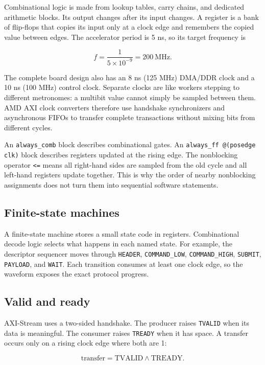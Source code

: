\documentclass[10pt]{article}
\begin{document}
Combinational logic is made from lookup tables, carry chains, and dedicated
arithmetic blocks. Its output changes after its input changes. A register is a
bank of flip-flops that copies its input only at a clock edge and remembers the
copied value between edges. The accelerator period is 5 ns, so its target
frequency is

\[
  f = \frac{1}{5\times10^{-9}} = 200\ \text{MHz}.
\]

The complete board design also has an 8 ns (125 MHz) DMA/DDR clock and a 10 ns
(100 MHz) control clock. Separate clocks are like workers stepping to different
metronomes: a multibit value cannot simply be sampled between them. AMD AXI
clock converters therefore use handshake synchronizers and asynchronous FIFOs
to transfer complete transactions without mixing bits from different cycles.

An \texttt{always\_comb} block describes combinational gates. An
\texttt{always\_ff @(posedge clk)} block describes registers updated at the
rising edge. The nonblocking operator \texttt{<=} means all right-hand sides
are sampled from the old cycle and all left-hand registers update together.
This is why the order of nearby nonblocking assignments does not turn them into
sequential software statements.

\subsection{Finite-state machines}

A finite-state machine stores a small state code in registers. Combinational
decode logic selects what happens in each named state. For example, the
descriptor sequencer moves through \texttt{HEADER}, \texttt{COMMAND\_LOW},
\texttt{COMMAND\_HIGH}, \texttt{SUBMIT}, \texttt{PAYLOAD}, and \texttt{WAIT}.
Each transition consumes at least one clock edge, so the waveform exposes the
exact protocol progress.

\subsection{Valid and ready}

AXI-Stream uses a two-sided handshake. The producer raises \texttt{TVALID}
when its data is meaningful. The consumer raises \texttt{TREADY} when it has
space. A transfer occurs only on a rising clock edge where both are 1:

\[
  \text{transfer} = \text{TVALID}\land\text{TREADY}.
\]
\end{document}
